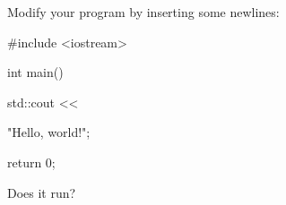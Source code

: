 Modify your program by inserting some newlines:
\begin{console}
#include <iostream>

int main()
{
    std::cout << 




            "Hello, world!\n";

    return 0;
}
\end{console}
Does it run?
